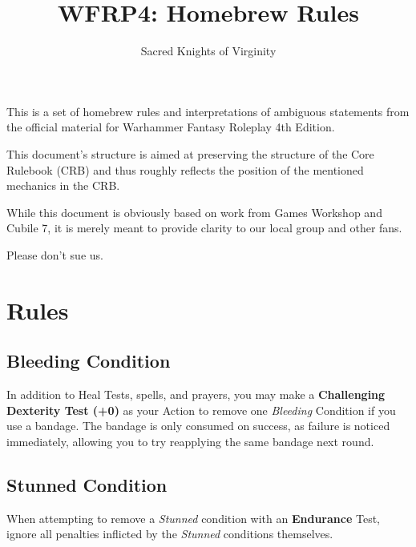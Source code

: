 \documentclass[parskip=full,11pt]{wfrp-short}
\title{WFRP4: Homebrew Rules}
\author{Sacred Knights of Virginity}
\begin{document}
\maketitle
\thispagestyle{empty} %

\section*{} %
\vspace{5pt}
This is a set of homebrew rules and interpretations of ambiguous statements
from the official material for Warhammer Fantasy Roleplay 4th Edition.

This document's structure is aimed at preserving the structure of the Core
Rulebook (CRB) and thus roughly reflects the position of the mentioned
mechanics in the CRB.

While this document is obviously based on work from Games Workshop and Cubile
7, it is merely meant to provide clarity to our local group and other fans.

Please don't sue us.

\pagebreak
\tableofcontents

\pagebreak

\section{Rules}

\subsection{Bleeding Condition}
In addition to Heal Tests, spells, and prayers, you may make a
\textbf{Challenging Dexterity Test (+0)} as your Action to remove one
\textit{Bleeding} Condition if you use a bandage.
The bandage is only consumed on success, as failure is noticed immediately,
allowing you to try reapplying the same bandage next round.

\subsection{Stunned Condition}
When attempting to remove a \textit{Stunned} condition with an
\textbf{Endurance} Test, ignore all penalties inflicted by the \textit{Stunned}
conditions themselves.
\end{document}
